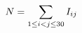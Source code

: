 \documentclass[preview]{standalone}
\begin{document}
\begin{align*}
\special{dvisvgm:raw <g id='unique000'>}N=\sum_{1\le i<j\le30}I_{ij}\special{dvisvgm:raw </g>}
\end{align*}
\end{document}
